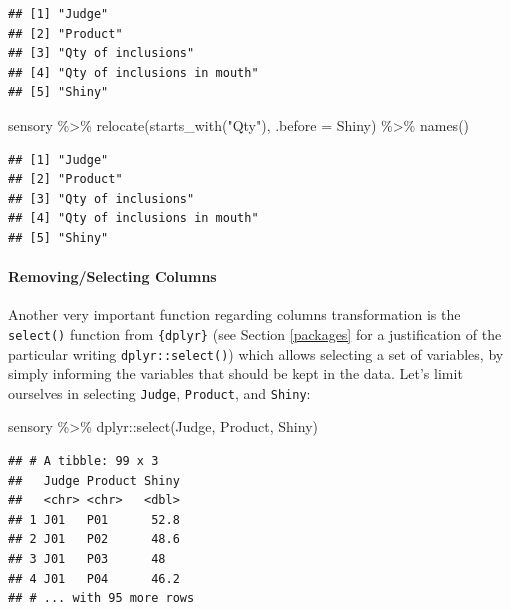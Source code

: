\documentclass[
]{krantz}
\makeatletter
\newenvironment{Shaded}{\begin{snugshade}}{\end{snugshade}}
\newcommand{\AttributeTok}[1]{\textcolor[rgb]{0.61,0.61,0.61}{#1}}
\newcommand{\FunctionTok}[1]{\textcolor[rgb]{0,0,0}{#1}}
\newcommand{\NormalTok}[1]{#1}
\newcommand{\SpecialCharTok}[1]{\textcolor[rgb]{0,0,0}{#1}}
\newcommand{\StringTok}[1]{\textcolor[rgb]{0.5,0.5,0.5}{#1}}
\newenvironment{kframe}{%
\medskip{}
\setlength{\fboxsep}{.8em}
 \def\at@end@of@kframe{}%
 \ifinner\ifhmode%
  \def\at@end@of@kframe{\end{minipage}}%
  \begin{minipage}{\columnwidth}%
 \fi\fi%
 \def\FrameCommand##1{\hskip\@totalleftmargin \hskip-\fboxsep
 \colorbox{shadecolor}{##1}\hskip-\fboxsep
     \hskip-\linewidth \hskip-\@totalleftmargin \hskip\columnwidth}%
 \MakeFramed {\advance\hsize-\width
   \@totalleftmargin\z@ \linewidth\hsize
   \@setminipage}}%
 {\par\unskip\endMakeFramed%
 \at@end@of@kframe}
\renewenvironment{Shaded}{\begin{kframe}}{\end{kframe}}
\makeatother
\begin{document}
\begin{verbatim}
## [1] "Judge"                     
## [2] "Product"                   
## [3] "Qty of inclusions"         
## [4] "Qty of inclusions in mouth"
## [5] "Shiny"
\end{verbatim}

\begin{Shaded}
\begin{Highlighting}[]
\NormalTok{sensory }\SpecialCharTok{\%\textgreater{}\%}
  \FunctionTok{relocate}\NormalTok{(}\FunctionTok{starts\_with}\NormalTok{(}\StringTok{"Qty"}\NormalTok{), }\AttributeTok{.before =}\NormalTok{ Shiny) }\SpecialCharTok{\%\textgreater{}\%}
  \FunctionTok{names}\NormalTok{()}
\end{Highlighting}
\end{Shaded}

\begin{verbatim}
## [1] "Judge"                     
## [2] "Product"                   
## [3] "Qty of inclusions"         
## [4] "Qty of inclusions in mouth"
## [5] "Shiny"
\end{verbatim}

\hypertarget{removingselecting-columns}{%
\paragraph*{Removing/Selecting Columns}\label{removingselecting-columns}}

Another very important function regarding columns transformation is the \texttt{select()} function from \texttt{\{dplyr\}} (see Section \ref{packages} for a justification of the particular writing \texttt{dplyr::select()}) which allows selecting a set of variables, by simply informing the variables that should be kept in the data. Let's limit ourselves in selecting \texttt{Judge}, \texttt{Product}, and \texttt{Shiny}:

\begin{Shaded}
\begin{Highlighting}[]
\NormalTok{sensory }\SpecialCharTok{\%\textgreater{}\%}
\NormalTok{  dplyr}\SpecialCharTok{::}\FunctionTok{select}\NormalTok{(Judge, Product, Shiny)}
\end{Highlighting}
\end{Shaded}

\begin{verbatim}
## # A tibble: 99 x 3
##   Judge Product Shiny
##   <chr> <chr>   <dbl>
## 1 J01   P01      52.8
## 2 J01   P02      48.6
## 3 J01   P03      48  
## 4 J01   P04      46.2
## # ... with 95 more rows
\end{verbatim}
\end{document}
